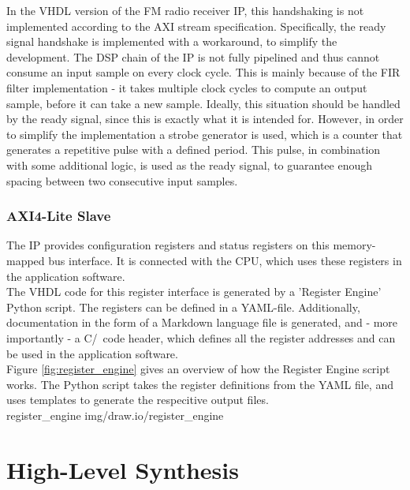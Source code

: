 In the VHDL version of the FM radio receiver IP, this handshaking is not implemented according to the AXI stream specification.
Specifically, the ready signal handshake is implemented with a workaround, to simplify the development.
The DSP chain of the IP is not fully pipelined and thus cannot consume an input sample on every clock cycle.
This is mainly because of the FIR filter implementation - it takes multiple clock cycles to compute an output sample, before it can take a new sample.
Ideally, this situation should be handled by the ready signal, since this is exactly what it is intended for.
However, in order to simplify the implementation a strobe generator is used, which is a counter that generates a repetitive pulse with a defined period.
This pulse, in combination with some additional logic, is used as the ready signal, to guarantee enough spacing between two consecutive input samples.

\subsubsection{AXI4-Lite Slave}

The IP provides configuration registers and status registers on this memory-mapped bus interface.
It is connected with the CPU, which uses these registers in the application software.\\

The VHDL code for this register interface is generated by a 'Register Engine' Python script.
The registers can be defined in a YAML-file.
Additionally, documentation in the form of a Markdown language file is generated, and - more importantly - a C/\cplusplus\ code header, which defines all the register addresses and can be used in the application software.\\

Figure \ref{fig:register_engine} gives an overview of how the Register Engine script works.
The Python script takes the register definitions from the YAML file, and uses templates to generate the respecitive output files.\\

 {register_engine} {img/draw.io/register_engine}


\section{High-Level Synthesis}


